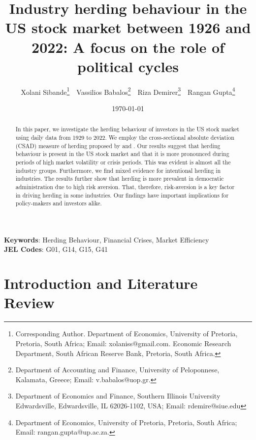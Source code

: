 \documentclass[
  letterpaper,
  DIV=11,
  numbers=noendperiod]{scrartcl}
\author{}
\date{}
\begin{document}
\title{Industry herding behaviour in the US stock market between 1926 and 2022: A focus on the role of political cycles}


\author { Xolani Sibande\footnote{Corresponding Author. Department of Economics, University of Pretoria, Pretoria, South Africa; Email: xolaniss@gmail.com. Economic Research Department, South African Reserve Bank, Pretoria, South Africa.} \,\, 
Vassilios Babalos\footnote{Department of Accounting and Finance, University of Peloponnese, Kalamata,  Greece; Email: v.babalos@uop.gr.} \,\,
Riza Demirer\footnote{Department of Economics and Finance, Southern Illinois University Edwardsville, Edwardsville, IL 62026-1102, USA; Email: rdemire@siue.edu} \,\,
Rangan Gupta\footnote{Department of Economics, University of Pretoria, Pretoria, South Africa; Email: rangan.gupta@up.ac.za.}
}
\date{\today}
\maketitle

\begin{abstract}

In this paper, we investigate the herding behaviour of investors in the US stock market using daily data from 1929 to 2022. We employ the cross-sectional absolute deviation (CSAD) measure of herding proposed by \cite{christie1995following} and \cite{chang2000examination}. Our results suggest that herding behaviour is present in the US stock market and that it is more pronounced during periods of high market volatility or crisis periods. This was evident is almost all the industry groups. Furthermore,  we find mixed evidence for intentional herding in industries. The results further show that herding is more prevalent in democratic administration due to high risk aversion. That, therefore, risk-aversion is a key factor in driving herding in some industries. Our findings have important implications for policy-makers and investors alike. 

\end{abstract}

\noindent\textbf{Keywords}: Herding Behaviour, Financial Crises, Market Efficiency
\\
\textbf{JEL Codes}: G01, G14, G15, G41
\newpage

\section{Introduction and Literature
Review}\label{introduction-and-literature-review}
\end{document}
